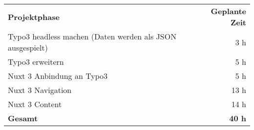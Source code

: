\begin{tabular}{lr}
\rowcolor{heading}\textbf{Projektphase} & \textbf{Geplante Zeit} \\
Typo3 headless machen (Daten werden als JSON ausgespielt) & 3 h \\
\rowcolor{odd} Typo3 erweitern & 5 h \\
Nuxt 3 Anbindung an Typo3 & 5 h \\
\rowcolor{odd}Nuxt 3 Navigation & 13 h \\
Nuxt 3 Content & 14 h \\
\hline
\hline
\rowcolor{odd}\textbf{Gesamt} & \textbf{40 h} \\
\end{tabular}

